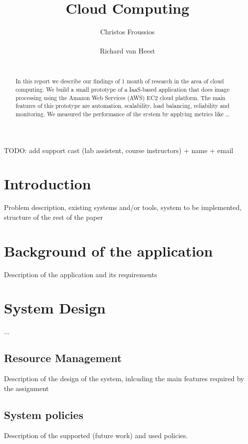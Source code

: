 \documentclass{stylesheet}
\begin{document}
\title{Cloud Computing}

\author{
\alignauthor
Christos Froussios\\
       \\
\alignauthor
Richard van Heest\\
       \\
}

\maketitle

TODO: add support cast (lab assistent, course instructors) + name + email

\begin{abstract}
In this report we describe our findings of 1 month of research in the area of cloud computing. We build a small prototype of a IaaS-based application that does image processing using the Amazon Web Services (AWS) EC2 cloud platform. The main features of this prototype are automation, scalability, load balancing, reliability and monitoring. We measured the performance of the system by applying metrics like …
\end{abstract}

\section{Introduction}
Problem description, existing systems and/or tools, system to be implemented, structure of the rest of the paper

\section{Background of the application}
Description of the application and its requirements

\section{System Design}
...
\subsection{Resource Management}
Description of the design of the system, inlcuding the main features required by the assignment

\subsection{System policies}
Description of the supported (future work) and used policies.
\end{document}
